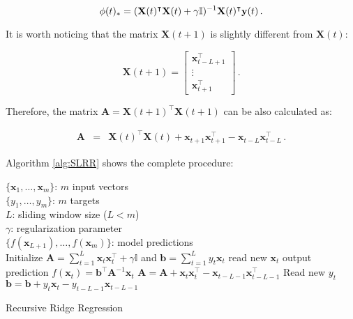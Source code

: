 \begin{equation}
\label{eq:optsolSLAAR}
{\bf \phi}(t)_*=({\bf X}(t)^\intercal{\bf X}(t)+\gamma
\mathbb{I})^{-1}{\bf X}(t)^\intercal{\bf y}(t) \, .
\end{equation}

It is worth noticing that the matrix $\mathbf{X}(t+1)$ is slightly
different from $\mathbf{X}(t)$:

\begin{equation} \label{eq:recform}
\mathbf{X}(t+1) = 
\begin{bmatrix} \mathbf{x}_{t-L+1}^\intercal \\ \vdots \\
\mathbf{x}_{t+1}^\intercal
\end{bmatrix} \, .
\end{equation}

Therefore, the matrix $\mathbf{A}=\mathbf{X}(t+1)^\intercal
\mathbf{X}(t+1) $ can be also calculated as:

\begin{eqnarray*}
\mathbf{A}&=&\mathbf{X}(t)^\intercal \mathbf{X}(t) +  \mathbf{x}_{t+1}
\mathbf{x}_{t+1}^\intercal -
\mathbf{x}_{t-L} \mathbf{x}_{t-L}^\intercal \, .
\end{eqnarray*}

Algorithm \ref{alg:SLRR} shows the complete procedure:



\begin{algorithm}[ht]
\begin{algorithmic}[1]
\REQUIRE $\,$ \\
$\{\mathbf{x}_1,\dots,\mathbf{x}_m \}$: $m$ input vectors \\
$\{y_1,\dots,y_m \}$: $m$ targets \\
$L$: sliding window size ($L<m$) \\
$\gamma$: regularization parameter \\
\ENSURE  $\,$ \\
$\{f(\mathbf{x}_{L+1}),\dots,f(\mathbf{x}_m) \}$: model predictions \\
\STATE Initialize $\mathbf{A}=\displaystyle \sum_{t=1}^L \mathbf{x}_t
\mathbf{x}_t^\intercal + \gamma \mathbb{I}$
and $\mathbf{b}=\displaystyle \sum_{t=1}^Ly_t \mathbf{x}_t$
        \STATE read new $\mathbf{x}_t$
        \STATE output prediction $f(\mathbf{x}_t) =  \mathbf{b}^\intercal
\mathbf{A}^{-1}\mathbf{x}_t$
        \STATE $\mathbf{A} = \mathbf{A} + \mathbf{x}_t \mathbf{x}_t^\intercal-
\mathbf{x}_{t-L-1} \mathbf{x}_{t-L-1}^\intercal  $
        \STATE Read new $y_t$
        \STATE $\mathbf{b} = \mathbf{b} + y_t \mathbf{x}_t - y_{t-L-1}\mathbf{x}_{t-L-1}$
\ENDFOR

\end{algorithmic}
\caption{Recursive Ridge Regression}
\label{alg:SLRR}
\end{algorithm}


